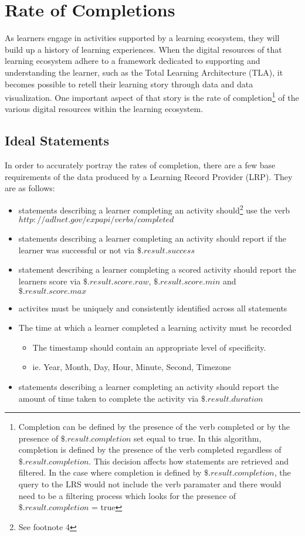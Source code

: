 \documentclass{article}
\begin{document}
\section{Rate of Completions}

As learners engage in activities supported by a learning ecosystem, they will build
up a history of learning experiences. When the digital resources of that learning ecosystem
adhere to a framework dedicated to supporting and understanding the
learner, such as the Total Learning Architecture (TLA), it becomes
possible to retell their learning story through data and data visualization. One important aspect of
that story is the rate of completion\footnote{\label{defOfCompletion}
  Completion can be defined by the presence of the verb completed or by the presence of
  $\$.result.completion$ set equal to true. In this algorithm,
  completion is defined by the presence of the verb completed
  regardless of $\$.result.completion$. This decision affects how
  statements are retrieved and filtered. In the case where completion
  is defined by $\$.result.completion$, the query to the LRS would not
  include the verb paramater and there would need to be a filtering
  process which looks for the presence of $\$.result.completion$ =
  true} of the various digital resources within the learning
ecosystem.
\subsection{Ideal Statements}

In order to accurately portray the rates of completion, there
are a few base requirements of the data produced by a Learning Record
Provider (LRP). They are as follows:
\begin{itemize}
\item statements describing a learner completing an activity
  should\footnote{\label{verbIRICompletion} See footnote 4}
  use the verb $http://adlnet.gov/expapi/verbs/completed$
\item statements describing a learner completing an activity should
  report if the learner was successful or not via
  $\$.result.success$
\item statement describing a learner completing a scored activity
  should report the learners score via $\$.result.score.raw$,
  $\$.result.score.min$ and $\$.result.score.max$
\item activites must be uniquely and consistently identified across
  all statements
\item The time at which a learner completed a learning activity must be recorded
  \begin{itemize}
  \item The timestamp should contain an appropriate level of specificity.
  \item ie. Year, Month, Day, Hour, Minute, Second, Timezone
  \end{itemize}
\item statements describing a learner completing an activity should
  report the amount of time taken to complete the activity via $\$.result.duration$
\end{itemize}
\end{document}
